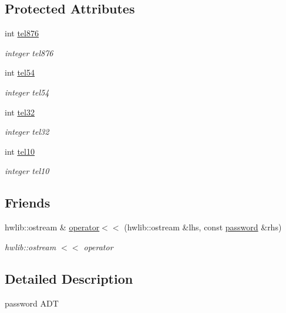 \subsection*{Protected Attributes}
\begin{DoxyCompactItemize}
\item 
int \hyperlink{classpassword_a0e2e6d171003a3a8594a2cfec2b9c059}{tel876}
\begin{DoxyCompactList}\small\item\em integer tel876 \end{DoxyCompactList}\item 
int \hyperlink{classpassword_ad5afb40aeb150953f66a1c14745297bc}{tel54}
\begin{DoxyCompactList}\small\item\em integer tel54 \end{DoxyCompactList}\item 
int \hyperlink{classpassword_a93ef3ccb4e71a683115c12435c89411d}{tel32}
\begin{DoxyCompactList}\small\item\em integer tel32 \end{DoxyCompactList}\item 
int \hyperlink{classpassword_af09c363ed2ec22c8e900fdd6bf66c1f6}{tel10}
\begin{DoxyCompactList}\small\item\em integer tel10 \end{DoxyCompactList}\end{DoxyCompactItemize}
\subsection*{Friends}
\begin{DoxyCompactItemize}
\item 
hwlib\+::ostream \& \hyperlink{classpassword_a8ce6de07d3729f31df4476763ca155ca}{operator$<$$<$} (hwlib\+::ostream \&lhs, const \hyperlink{classpassword}{password} \&rhs)
\begin{DoxyCompactList}\small\item\em hwlib\+::ostream $<$$<$ operator \end{DoxyCompactList}\end{DoxyCompactItemize}


\subsection{Detailed Description}
password A\+DT 

